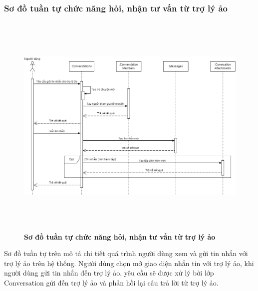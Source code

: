 \subsubsection{Sơ đồ tuần tự chức năng hỏi, nhận tư vấn từ trợ lý ảo}
\begin{figure}[H]
  \centering
  \includegraphics[width=15.5cm,height=11cm]{Images/sequence/sequence_chat_ai.png}
  \caption[Sơ đồ tuần tự chức năng hỏi, nhận tư vấn từ trợ lý ảo]{\bfseries \fontsize{12pt}{0pt}
  \selectfont Sơ đồ tuần tự chức năng hỏi, nhận tư vấn từ trợ lý ảo}
  \label{sequence_chat_ai} %
\end{figure}
Sơ đồ tuần tự trên mô tả chi tiết quá trình người dùng xem và gửi tin nhắn với trợ lý ảo trên hệ thống. Người dùng chọn mở giao diện nhắn tin với trợ lý ảo, 
khi người dùng gửi tin nhắn đến trợ lý ảo, yêu cầu sẽ được xử lý bởi lớp Conversation gửi đến trợ lý ảo và phản hồi lại câu trả lời từ trợ lý ảo.

